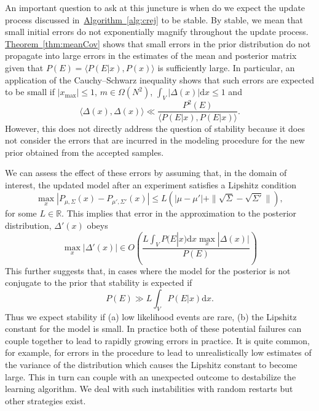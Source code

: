 \documentclass[twoside]{article}
\newcommand{\thm}[1]{\hyperref[thm:#1]{Theorem~\ref*{thm:#1}}}
\newcommand{\alg}[1]{\hyperref[alg:#1]{Algorithm~\ref*{alg:#1}}}
\begin{document}
An important question to ask at this juncture is when do we expect the update process discussed in~\alg{crej} to be stable.  By stable, we mean that small initial errors do not exponentially magnify throughout the update process.  \thm{meanCov} shows that small errors in the prior distribution do not propagate into large errors in the estimates of the mean and posterior matrix given that $P(E)= \langle P(E|x),P(x)\rangle$ is sufficiently large.  In particular, an application of the Cauchy--Schwarz inequality shows that such errors are expected to be small if $|x_{\max}|\le 1$, $m\in \Omega(N^2)$, $\int_V |\Delta(x)| \mathrm{d}x\le 1$ and 
$$
\langle\Delta(x),\Delta(x)\rangle \ll \frac{P^2(E)}{{\langle P(E|x),P(E|x)\rangle}}.
$$
However, this does not directly address the question of stability because it does not consider the errors that are incurred in the modeling procedure for the new prior obtained from the accepted samples.

We can assess the effect of these errors by assuming that, in the domain of interest, the updated model after an experiment satisfies a Lipshitz condition
\begin{equation}
\max_x|P_{\mu,\Sigma}(x) - P_{\mu' ,\Sigma'}(x)| \le L(|\mu- \mu'| +\|\sqrt{\Sigma}- \sqrt{\Sigma'}\|),
\end{equation}
for some $L\in \mathbb{R}$.  This implies that error in the approximation to the posterior distribution, $\Delta'(x)$ obeys
\begin{equation}
\max_x |\Delta'(x)| \in O\left( \frac{L\int_V P(E|x) \mathrm{d}x \max_x |\Delta(x)|}{P(E)}\right)
\end{equation}
This further suggests that, in cases where the model for the posterior is not conjugate to the prior that stability is expected if
\begin{equation}
P(E) \gg {L\int_V P(E|x) \mathrm{d}x }.
\end{equation}
Thus we expect stability if (a) low likelihood events are rare, (b) the Lipshitz constant for the model is small.  In practice both of these potential failures can couple together to lead to rapidly growing errors in practice.  It is quite common, for example, for errors in the procedure to lead to unrealistically low estimates of the variance of the distribution which causes the Lipshitz constant to become large.  This in turn can couple with an unexpected outcome to destabilize the learning algorithm.  We deal with such instabilities with random restarts but other strategies exist.
\end{document}
